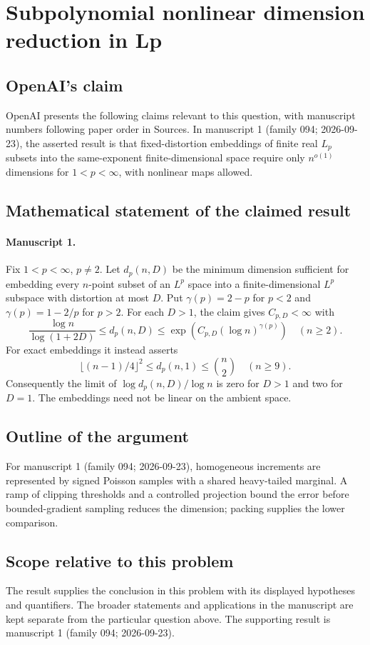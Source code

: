\documentclass[11pt]{article}
\begin{document}
\section*{Subpolynomial nonlinear dimension reduction in Lp}

\subsection{OpenAI's claim}
OpenAI presents the following claims relevant to this question, with manuscript numbers following paper order in Sources. In manuscript 1 (family 094; 2026-09-23), the asserted result is that fixed-distortion embeddings of finite real $L_p$ subsets into the same-exponent finite-dimensional space require only $n^{o(1)}$ dimensions for $1<p<\infty$, with nonlinear maps allowed.

\subsection{Mathematical statement of the claimed result}
\paragraph{Manuscript 1.}
Fix $1<p<\infty$, $p\ne2$. Let $d_p(n,D)$ be the minimum dimension sufficient for embedding every $n$-point subset of an $L^p$ space into a finite-dimensional $L^p$ subspace with distortion at most $D$. Put $\gamma(p)=2-p$ for $p<2$ and $\gamma(p)=1-2/p$ for $p>2$. For each $D>1$, the claim gives $C_{p,D}<\infty$ with
\[
 \frac{\log n}{\log(1+2D)}\le d_p(n,D)
 \le\exp(C_{p,D}(\log n)^{\gamma(p)})\quad(n\ge2).
\]
For exact embeddings it instead asserts
\[
 \lfloor(n-1)/4\rfloor^2\le d_p(n,1)\le\binom n2\quad(n\ge9).
\]
Consequently the limit of $\log d_p(n,D)/\log n$ is zero for $D>1$ and two for $D=1$. The embeddings need not be linear on the ambient space.

\subsection{Outline of the argument}
For manuscript 1 (family 094; 2026-09-23), homogeneous increments are represented by signed Poisson samples with a shared heavy-tailed marginal. A ramp of clipping thresholds and a controlled projection bound the error before bounded-gradient sampling reduces the dimension; packing supplies the lower comparison.

\subsection{Scope relative to this problem}
The result supplies the conclusion in this problem with its displayed hypotheses and quantifiers. The broader statements and applications in the manuscript are kept separate from the particular question above. The supporting result is manuscript 1 (family 094; 2026-09-23).
\end{document}
